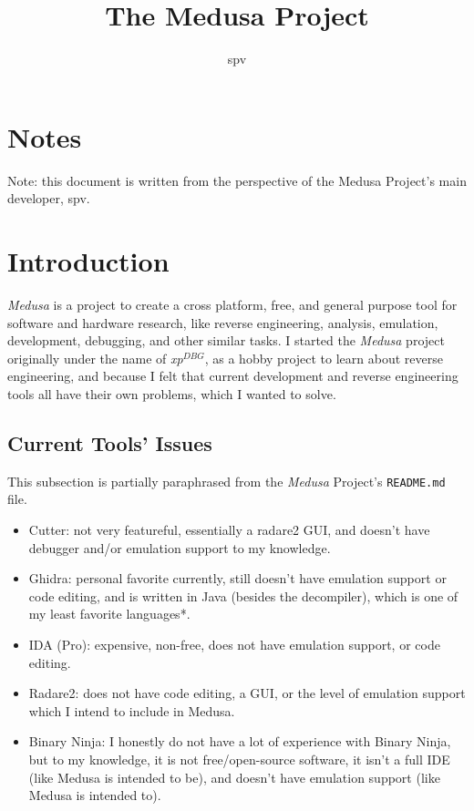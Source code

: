 \documentclass{article}
\title{The Medusa Project}
\author{spv}
\begin{document}
	\maketitle

	\section{Notes}
	Note: this document is written from the perspective of the Medusa Project's
	main developer, spv.

	\section{Introduction}
	\textit{Medusa} is a project to create a cross platform, free, and general
	purpose tool for software and hardware research, like reverse engineering,
	analysis, emulation, development, debugging, and other similar tasks. I
	started the \textit{Medusa} project originally under the name of
	\textit{xp$^{DBG}$}, as a hobby project to learn about reverse engineering,
	and because I felt that current development and reverse engineering tools
	all have their own problems, which I wanted to solve.

	\subsection{Current Tools' Issues}
	This subsection is partially paraphrased from the \textit{Medusa} Project's
	\texttt{README.md} file.

	\begin{itemize}
		\item Cutter: not very featureful, essentially a radare2 GUI, and
		doesn't have debugger and/or emulation support to my knowledge.
		\item Ghidra: personal favorite currently, still doesn't have emulation
		support or code editing, and is written in Java (besides the
		decompiler), which is one of my least favorite languages*.
		\item IDA (Pro): expensive, non-free, does not have emulation support,
		or code editing.
		\item Radare2: does not have code editing, a GUI, or the level of
		emulation support which I intend to include in Medusa.
		\item Binary Ninja: I honestly do not have a lot of experience with
		Binary Ninja, but to my knowledge, it is not free/open-source software,
		it isn't a full IDE (like Medusa is intended to be), and doesn't have
		emulation support (like Medusa is intended to).
	\end{itemize}
\end{document}
